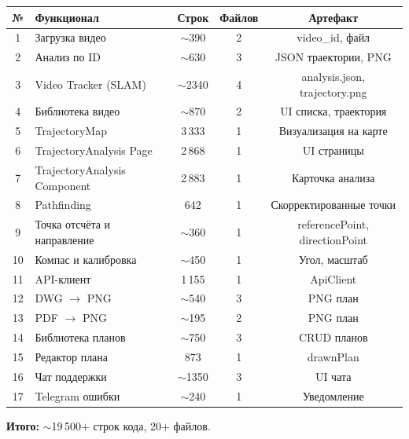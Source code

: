 \documentclass[12pt,a4paper]{article}
\begin{document}
\begin{center}
\begin{tabular}{clccc}
\toprule
№ & Функционал & Строк & Файлов & Артефакт \\
\midrule
1 & Загрузка видео & $\sim$390 & 2 & video\_id, файл \\
2 & Анализ по ID & $\sim$630 & 3 & JSON траектории, PNG \\
3 & Video Tracker (SLAM) & $\sim$2340 & 4 & analysis.json, trajectory.png \\
4 & Библиотека видео & $\sim$870 & 2 & UI списка, траектория \\
5 & TrajectoryMap & 3\,333 & 1 & Визуализация на карте \\
6 & TrajectoryAnalysis Page & 2\,868 & 1 & UI страницы \\
7 & TrajectoryAnalysis Component & 2\,883 & 1 & Карточка анализа \\
8 & Pathfinding & 642 & 1 & Скорректированные точки \\
9 & Точка отсчёта и направление & $\sim$360 & 1 & referencePoint, directionPoint \\
10 & Компас и калибровка & $\sim$450 & 1 & Угол, масштаб \\
11 & API-клиент & 1\,155 & 1 & ApiClient \\
12 & DWG $\rightarrow$ PNG & $\sim$540 & 3 & PNG план \\
13 & PDF $\rightarrow$ PNG & $\sim$195 & 2 & PNG план \\
14 & Библиотека планов & $\sim$750 & 3 & CRUD планов \\
15 & Редактор плана & 873 & 1 & drawnPlan \\
16 & Чат поддержки & $\sim$1350 & 3 & UI чата \\
17 & Telegram ошибки & $\sim$240 & 1 & Уведомление \\
\bottomrule
\end{tabular}
\end{center}

\vspace{1em}
\textbf{Итого:} $\sim$19\,500+ строк кода, 20+ файлов.
\end{document}
